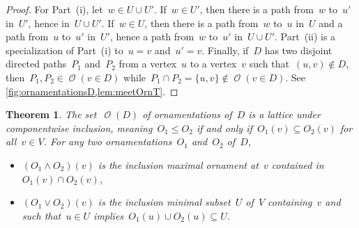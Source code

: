 \documentclass{amsart}
\newtheorem{theorem}{Theorem}[section]
\theoremstyle{definition}
\renewcommand{\c}[1]{\mathcal{#1}} %
\newcommand{\set}[2]{\left\{ #1 \;\middle|\; #2 \right\}} %
\newcommand{\meet}{\wedge} %
\newcommand{\join}{\vee} %
\DeclareMathOperator{\Orn}{\c{O}}  %
\begin{document}
\begin{proof}
For Part~(i), let~$w \in U \cup U'$. If~$w \in U'$, then there is a path from~$w$ to~$u'$ in~$U'$, hence in~$U \cup U'$.
If~$w \in U$, then there is a path from~$w$ to~$u$ in~$U$ and a path from~$u$ to~$u'$ in~$U'$, hence a path from~$w$ to~$u'$ in~$U \cup U'$.
Part~(ii) is a specialization of Part~(i) to~$u = v$ and~$u' = v$.
Finally, if~$D$ has two disjoint directed paths~$P_1$ and~$P_2$ from a vertex~$u$ to a vertex~$v$ such that~$(u,v) \notin D$, then~$P_1, P_2 \in \Orn(v \in D)$ while~$P_1 \cap P_2 = \{u,v\} \notin \Orn(v \in D)$.
See \cref{fig:ornamentationsD,lem:meetOrnT}.
\end{proof}

\begin{theorem}
\label{thm:OrnMeetJoin}
The set~$\Orn(D)$ of ornamentations of~$D$ is a lattice under componentwise inclusion, meaning~$O_1 \le O_2$ if and only if~$O_1(v) \subseteq O_2(v)$ for all~$v \in V$.
For any two ornamentations~$O_1$ and~$O_2$ of~$D$,
\begin{itemize}
\item $(O_1 \meet O_2)(v)$ is the inclusion maximal ornament at~$v$ contained in~$O_1(v) \cap O_2(v)$,
\item $(O_1 \join O_2)(v)$ is the inclusion minimal subset~$U$ of~$V$ containing~$v$ and such that~$u \in U$ implies~$O_1(u) \cup O_2(u) \subseteq U$.
\end{itemize}
\end{theorem}
\end{document}

